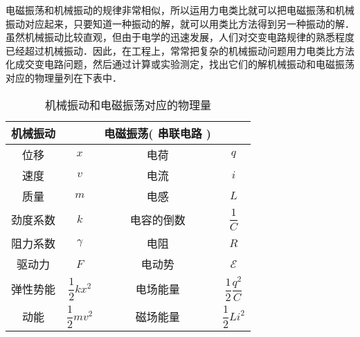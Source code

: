 
电磁振荡和机械振动的规律非常相似，所以运用力电类比就可以把电磁振荡和机械振动对应起来，只要知道一种振动的解，就可以用类比方法得到另一种振动的解．虽然机械振动比较直观，但由于电学的迅速发展，人们对交变电路规律的熟悉程度已经超过机械振动．因此，在工程上，常常把复杂的机械振动问题用力电类比方法化成交变电路问题，然后通过计算或实验测定，找出它们的解机械振动和电磁振荡对应的物理量列在下表中．

\begin{table}[ht]
\centering
\caption{机械振动和电磁振荡对应的物理量}\label{MeElec_tab1}
\begin{tabular}{cccc}
\hline  机械振动  & &  电磁振荡(  串联电路 ) &\\ \hline  位移  & $x$ &  电荷  & $q$ \\ \hline  速度  & $v $&  电流  & $i$ \\ \hline  质量  & $m$ &  电感  & $L$ \\ \hline  劲度系数  & $k$ &  电容的倒数  & $\dfrac1C$ \\ \hline  阻力系数  & $\gamma$ &  电阻  & $R$  \\ \hline  驱动力  &$F$ &  电动势  & $\mathscr E$  \\ \hline  弹性势能  &  $\dfrac12 k x^2$ &  电场能量  & $\dfrac12 \dfrac{q^2}C$ \\ \hline  动能  & $\dfrac12 m v^2$ &  磁场能量  &  $\dfrac12 L i^2$ \\ \hline
\end{tabular}
\end{table}

